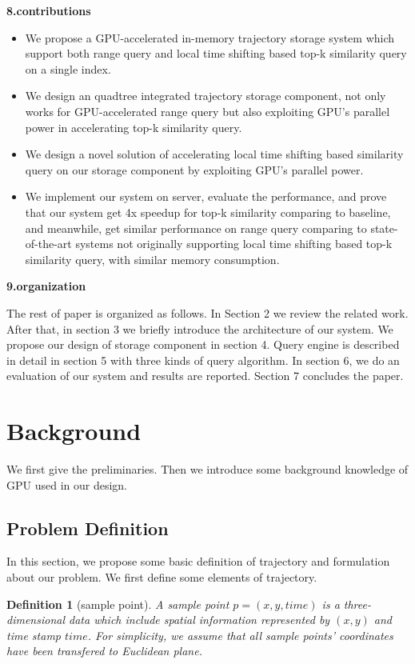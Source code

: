 \documentclass[conference]{IEEEtran}
\begin{document}
\textbf{8.contributions}

\begin{itemize}
	\item We propose a GPU-accelerated in-memory trajectory storage system which support both range query and local time shifting based top-k similarity query on a single index.
	\item We design an quadtree integrated trajectory storage component, not only works for GPU-accelerated range query but also exploiting GPU's parallel power in accelerating top-k similarity query.
	\item We design a novel solution of accelerating local time shifting based similarity query on our storage component by exploiting GPU's parallel power.
	\item We implement our system on server, evaluate the performance, and prove that our system get 4x speedup for top-k similarity comparing to baseline, and meanwhile, get similar performance on range query comparing to state-of-the-art systems not originally supporting local time shifting based top-k similarity query, with similar memory consumption.
\end{itemize}
	 
\textbf{9.organization}

	The rest of paper is organized as follows. In Section 2 we review the related work. After that, in section 3 we briefly introduce the architecture of our system. We propose our design of storage component in section 4. Query engine is described in detail in section 5 with three kinds of query algorithm. In section 6, we do an evaluation of our system and results are reported. Section 7 concludes the paper. 



\section{Background}
We first give the preliminaries.
Then we introduce some background knowledge of GPU used in our design.

\subsection{Problem Definition}
	In this section, we propose some basic definition of trajectory and formulation about our problem. We first define some elements of trajectory.
	
	\newtheorem{define}{Definition}
	\begin{define}[sample point]
		A sample point $p=(x,y,time)$ is a three-dimensional data which include spatial information represented by $(x,y)$ and time stamp $time$. For simplicity, we assume that all sample points' coordinates have been transfered to Euclidean plane.
	\end{define}
\end{document}
